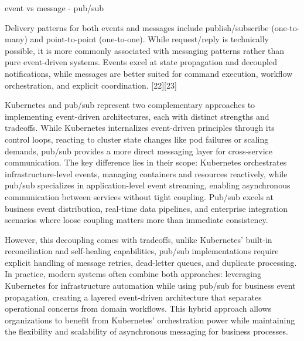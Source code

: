 \documentclass[]{final}
\begin{document}
event vs message - pub/sub

Delivery patterns for both events and messages include publish/subscribe
(one-to-many) and point-to-point (one-to-one). While request/reply is
technically possible, it is more commonly associated with messaging patterns
rather than pure event-driven systems. Events excel at state propagation
and decoupled notifications, while messages are better suited for command
execution, workflow orchestration, and explicit coordination. [22][23]

Kubernetes and pub/sub represent two complementary approaches to implementing
event-driven architectures, each with distinct strengths and tradeoffs.
While Kubernetes internalizes event-driven principles through its control
loops, reacting to cluster state changes like pod failures or scaling
demands, pub/sub provides a more direct messaging layer for cross-service
communication. The key difference lies in their scope: Kubernetes
orchestrates infrastructure-level events, managing containers and resources
reactively, while pub/sub specializes in application-level event streaming,
enabling asynchronous communication between services without tight coupling.
Pub/sub excels at business event distribution, real-time data pipelines, and
enterprise integration scenarios where loose coupling matters more than
immediate consistency.

However, this decoupling comes with tradeoffs,
unlike Kubernetes' built-in reconciliation and self-healing capabilities,
pub/sub implementations require explicit handling of message retries,
dead-letter queues, and duplicate processing. In practice, modern systems
often combine both approaches: leveraging Kubernetes for infrastructure
automation while using pub/sub for business event propagation, creating a
layered event-driven architecture that separates operational concerns from
domain workflows. This hybrid approach allows organizations to benefit
from Kubernetes' orchestration power while maintaining the flexibility
and scalability of asynchronous messaging for business processes.
\end{document}
